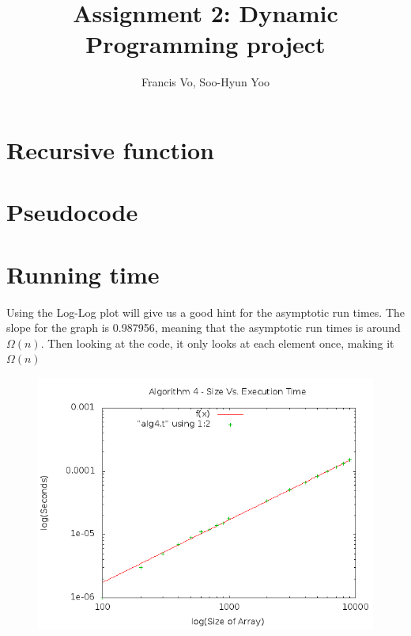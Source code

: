 \documentclass[a4paper,10pt]{article}
\title{Assignment 2: Dynamic Programming project}
\author{Francis Vo, Soo-Hyun Yoo}
\begin{document}
	\maketitle

	\section{Recursive function}
	\section{Pseudocode}
	\section{Running time}
		Using the Log-Log plot will give us a good hint for the asymptotic run times.  
		The slope for the graph is 0.987956, meaning that the asymptotic run times is around $\Omega(n)$. 
		Then looking at the code, it only looks at each element once, making it $\Omega(n)$
		\begin{figure}[!htb]
			\centering
			\includegraphics[scale=.5]{timingfiles/alg4plotlog.png}
		\end{figure}
\end{document}
